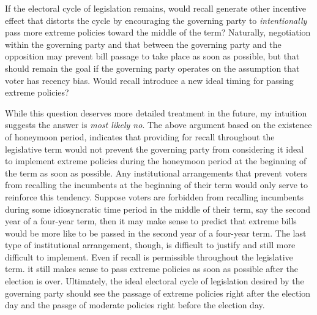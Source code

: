 \documentclass{article}
\begin{document}
		If the electoral cycle of legislation remains,
		would recall generate other incentive effect
		that distorts the cycle by encouraging the governing party
		to \textit{intentionally} pass more extreme policies
		toward the middle of the term?
		Naturally,
		negotiation within the governing party and
		that between the governing party and the opposition
		may prevent bill passage to take place as soon as possible,
		but that should remain the goal if the governing party operates on
		the assumption that voter has recency bias.
		Would recall introduce a new ideal timing for passing extreme policies?
		
		While this question deserves
		more detailed treatment in the future,
		my intuition suggests
		the answer is \textit{most likely no}.
		The above argument based on the existence of honeymoon period,
		indicates that providing for recall throughout the legislative term
		would not prevent the governing party from
		considering it ideal to implement extreme policies
		during the honeymoon period at the beginning of the term
		as soon as possible.
		Any institutional arrangements
		that prevent voters from recalling the incumbents
		at the beginning of their term would only serve to reinforce this tendency.
		Suppose voters are forbidden from
		recalling incumbents
		during some idiosyncratic time period in the middle of their term,
		say the second year of a four-year term,
		then it may make sense to predict that
		extreme bills would be more like
		to be passed in the second year of a four-year term.
		The last type of institutional arrangement,
		though,
		is difficult to justify and still more difficult to implement.
		Even if recall is permissible throughout the legislative term.
		it still makes sense to pass extreme policies
		as soon as possible after the election is over.
		Ultimately,
		the ideal electoral cycle of legislation desired by the governing party
		should see the passage of extreme policies
		right after the election day
		and the passge of moderate policies right before the election day.
		
		
		
		
		
\end{document}

